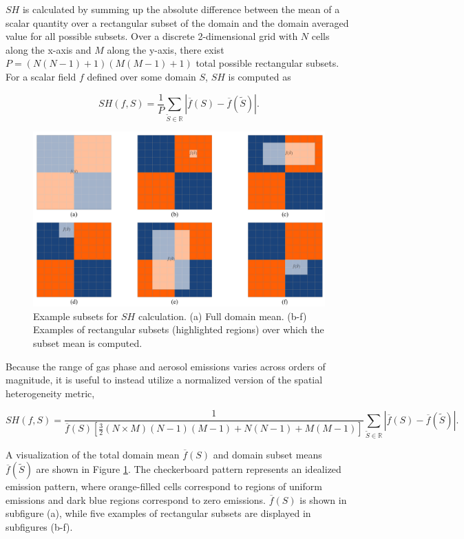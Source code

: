 $SH$ is calculated by summing up the absolute difference between the mean of a scalar quantity over a rectangular subset of the domain and the domain averaged value for all possible subsets. Over a discrete 2-dimensional grid with $N$ cells along the x-axis and $M$ along the y-axis, there exist \\$P=(N(N-1)+1)(M(M-1)+1)$ total possible rectangular subsets. For a scalar field $f$ defined over some domain $S$, $SH$ is computed as

\begin{equation}
SH(f, S) = \frac{1}{P}\sum_{\tilde{S}\in \mathbb{R}}|\overline{f}(S) - \overline{f}(\tilde{S})|.
\end{equation}

\begin{figure}[!t]
	\centering
	\includegraphics[width=\textwidth]{figures/chapter2/SH-subarray-examples.pdf}
	\caption{Example subsets for $SH$ calculation. (a) Full domain mean. (b-f) Examples of rectangular subsets (highlighted regions) over which the subset mean is computed.}
	\label{fig:sh-subarrays}
\end{figure}

Because the range of gas phase and aerosol emissions varies across orders of magnitude, it is useful to instead utilize a normalized version of the spatial heterogeneity metric,

\begin{equation}
SH(f, S) = \frac{1}{\overline{f}(S)\left[\frac{3}{2}(N\times M)(N-1)(M-1) + N(N-1) + M(M-1)\right]}\sum_{\tilde{S}\in \mathbb{R}}|\overline{f}(S) - \overline{f}(\tilde{S})|.
\end{equation}

A visualization of the total domain mean $\overline{f}(S)$ and domain subset means $\overline{f}(\tilde{S})$ are shown in Figure \ref{fig:sh-subarrays}. The checkerboard pattern represents an idealized emission pattern, where orange-filled cells correspond to regions of uniform emissions and dark blue regions correspond to zero emissions. $\overline{f}(S)$ is shown in subfigure (a), while five examples of rectangular subsets are displayed in subfigures (b-f).


